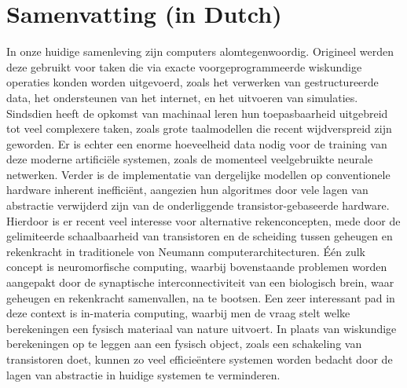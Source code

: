 \chapter*{Samenvatting (in Dutch)}
In onze huidige samenleving zijn computers alomtegenwoordig.
Origineel werden deze gebruikt voor taken die via exacte voorgeprogrammeerde wiskundige operaties konden worden uitgevoerd, zoals het verwerken van gestructureerde data, het ondersteunen van het internet, en het uitvoeren van simulaties.
Sindsdien heeft de opkomst van machinaal leren hun toepasbaarheid uitgebreid tot veel complexere taken, zoals grote taalmodellen die recent wijdverspreid zijn geworden.
Er is echter een enorme hoeveelheid data nodig voor de training van deze moderne artifici\"ele systemen, zoals de momenteel veelgebruikte neurale netwerken.
Verder is de implementatie van dergelijke modellen op conventionele hardware inherent ineffici\"ent, aangezien hun algoritmes door vele lagen van abstractie verwijderd zijn van de onderliggende transistor-gebaseerde hardware.
Hierdoor is er recent veel interesse voor alternative rekenconcepten, mede door de gelimiteerde schaalbaarheid van transistoren en de scheiding tussen geheugen en rekenkracht in traditionele von Neumann computerarchitecturen.
\'E\'en zulk concept is neuromorfische computing, waarbij bovenstaande problemen worden aangepakt door de synaptische interconnectiviteit van een biologisch brein, waar geheugen en rekenkracht samenvallen, na te bootsen.
Een zeer interessant pad in deze context is in-materia computing, waarbij men de vraag stelt welke berekeningen een fysisch materiaal van nature uitvoert.
In plaats van wiskundige berekeningen op te leggen aan een fysisch object, zoals een schakeling van transistoren doet, kunnen zo veel efficie\"entere systemen worden bedacht door de lagen van abstractie in huidige systemen te verminderen. \\

